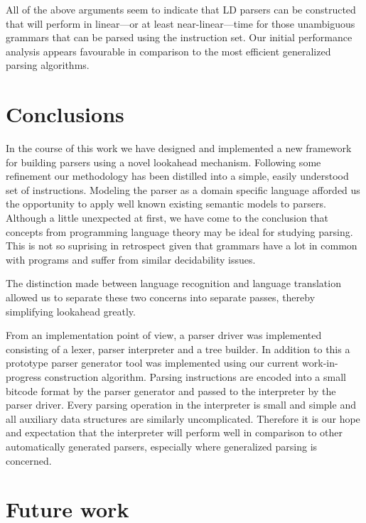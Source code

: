 \documentclass[a4paper,11pt]{article}
\begin{document}
All of the above arguments seem to indicate that LD parsers can be constructed that will perform in linear---or at least near-linear---time for those unambiguous grammars that can be parsed using the instruction set.
Our initial performance analysis appears favourable in comparison to the most efficient generalized parsing algorithms.

\section{Conclusions}

In the course of this work we have designed and implemented a new framework for building parsers using a novel lookahead mechanism.
Following some refinement our methodology has been distilled into a simple, easily understood set of instructions.
Modeling the parser as a domain specific language afforded us the opportunity to apply well known existing semantic models to parsers.
Although a little unexpected at first, we have come to the conclusion that concepts from programming language theory may be ideal for studying parsing.
This is not so suprising in retrospect given that grammars have a lot in common with programs and suffer from similar decidability issues.

The distinction made between language recognition and language translation allowed us to separate these two concerns into separate passes, 
thereby simplifying lookahead greatly. %

From an implementation point of view, a parser driver was implemented consisting of a lexer, parser interpreter and a tree builder.
In addition to this a prototype parser generator tool was implemented using our current work-in-progress construction algorithm.
Parsing instructions are encoded into a small bitcode format by the parser generator and passed to the interpreter by the parser driver.
Every parsing operation in the interpreter is small and simple and all auxiliary data structures are similarly uncomplicated. 
Therefore it is our hope and expectation that the interpreter will perform well in comparison to other automatically generated parsers, especially where generalized parsing is concerned.

\section{Future work}
\end{document}
